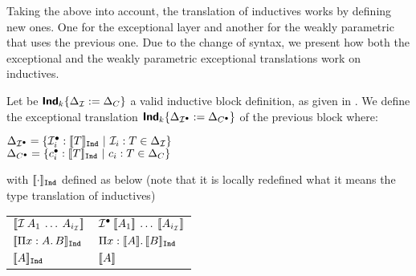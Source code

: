 Taking the above into account, the translation of inductives works by defining new ones. One for 
the exceptional layer and another for the weakly parametric that uses the previous one.
Due to the change of syntax, we present how both the exceptional and the weakly parametric exceptional translations
work on inductives.
\begin{Definition}
\label{def:TransInductiveDef}
Let be $\IndIntro[k][\varContext_\IndD][\varContext_C]$ a valid inductive block
definition, as given in . 
We define the exceptional translation 
$\IndIntro[k][\varContext_{\ConstructorTrans{\IndD}}][\varContext_{\ConstructorTrans{C}}]$
of the previous block where:
\newcommand{\ArgTrans}[1]{\ensuremath{[\![#1]\!]_{\text{\mathtexttt{Ind}}}}}
\begin{center}
$\varContext_{\ConstructorTrans{\IndD}} 
=
\{\ConstructorTrans{\IndD_i}: \ArgTrans{T} \ |\ \typing{\IndD_i}{T} \in \varContext_\IndD\}
$ \\
$\varContext_{\ConstructorTrans{C}} 
=
\{\ConstructorTrans{c_i}: \ArgTrans{T} \ |\ \typing{c_i}{T} \in \varContext_C\}
$
\end{center}
with $\ArgTrans{\cdot}$ defined as below (note that it is locally redefined what it means the type
translation of inductives)

\begin{tabular}{l@{$\hspace{0.1em}\termDef$\ \ }l}
$\TypeTrans{\app{\IndD}{A_1}{\dots}{\A_{i_\IndD}}}$ & $\app{\ConstructorTrans{\IndD}}{\TypeTrans{A_1}}{
                                                                                      \dots}{
                                                                                      \TypeTrans{A_{i_\IndD}}}$\\
$\ArgTrans{\depArrow{x}{A}{B}}$ & $\depArrow{x}{\TypeTrans{A}}{\ArgTrans{B}}$ \\
$\ArgTrans{A}$ & $[\![A]\!]$
\end{tabular}


\end{Definition}
